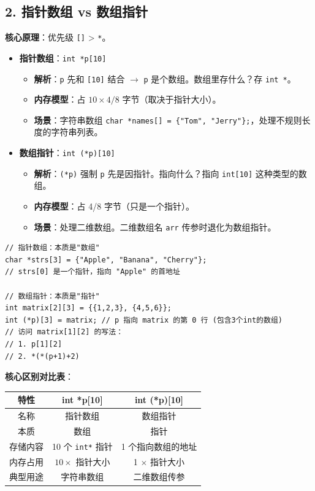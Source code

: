 \documentclass[a4paper,12pt]{article}
\begin{document}
\subsection{2. 指针数组 vs 数组指针}
\textbf{核心原理}：优先级 \texttt{[]} > \texttt{*}。
\begin{itemize}
    \item \textbf{指针数组}：\texttt{int *p[10]}
    \begin{itemize}
        \item \textbf{解析}：\texttt{p} 先和 \texttt{[10]} 结合 $\rightarrow$ \texttt{p} 是个数组。数组里存什么？存 \texttt{int *}。
        \item \textbf{内存模型}：占 $10 \times 4/8$ 字节（取决于指针大小）。
        \item \textbf{场景}：字符串数组 \texttt{char *names[] = \{"Tom", "Jerry"\};}，处理不规则长度的字符串列表。
    \end{itemize}
    \item \textbf{数组指针}：\texttt{int (*p)[10]}
    \begin{itemize}
        \item \textbf{解析}：\texttt{(*p)} 强制 \texttt{p} 先是因指针。指向什么？指向 \texttt{int[10]} 这种类型的数组。
        \item \textbf{内存模型}：占 4/8 字节（只是一个指针）。
        \item \textbf{场景}：处理二维数组。二维数组名 \texttt{arr} 传参时退化为数组指针。
    \end{itemize}
\end{itemize}
\begin{lstlisting}
// 指针数组：本质是"数组"
char *strs[3] = {"Apple", "Banana", "Cherry"};
// strs[0] 是一个指针，指向 "Apple" 的首地址

// 数组指针：本质是"指针"
int matrix[2][3] = {{1,2,3}, {4,5,6}};
int (*p)[3] = matrix; // p 指向 matrix 的第 0 行 (包含3个int的数组)
// 访问 matrix[1][2] 的写法：
// 1. p[1][2]
// 2. *(*(p+1)+2)
\end{lstlisting}

\textbf{核心区别对比表}：
\begin{center}
\begin{tabular}{|c|c|c|}
\hline
\textbf{特性} & \textbf{int *p[10]} & \textbf{int (*p)[10]} \\
\hline
名称 & 指针数组 & 数组指针 \\
\hline
本质 & 数组 & 指针 \\
\hline
存储内容 & 10 个 \texttt{int*} 指针 & 1 个指向数组的地址 \\
\hline
内存占用 & $10 \times$ 指针大小 & 1 $\times$ 指针大小 \\
\hline
典型用途 & 字符串数组 & 二维数组传参 \\
\hline
\end{tabular}
\end{center}
\end{document}
